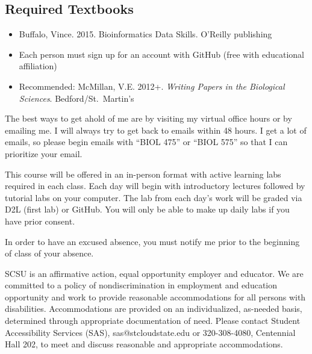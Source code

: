 \documentclass{tufte-handout}
\begin{document}
\begin{fullwidth}
\subsection{Required Textbooks}

\begin{itemize}
	\item Buffalo, Vince. 2015. Bioinformatics Data Skills. O'Reilly publishing 
	\item Each person must sign up for an account with GitHub (free with educational affiliation)
	\item Recommended: McMillan, V.E. 2012+. \emph{Writing Papers in the Biological Sciences}. Bedford/St.\ Martin's
\end{itemize}


 The best ways to get ahold of me are by visiting my virtual office hours or by emailing me. I will always try to get back to emails within 48 hours. I get a lot of emails, so please begin emails with ``BIOL 475'' or ``BIOL 575'' so that I can prioritize your email.

 This course will be offered in an in-person format with active learning labs required in each class. Each day will begin with introductory lectures followed by tutorial labs on your computer. The lab from each day's work will be graded via D2L (first lab) or GitHub. You will only be able to make up daily labs if you have prior consent. 


\color{blue}
In order to have an excused absence, you must notify me prior to the beginning of class of your absence. 
\color{black}


 SCSU is an affirmative action, equal opportunity employer and educator. We are committed to a policy of nondiscrimination in employment and education opportunity and work to provide reasonable accommodations for all persons with disabilities. Accommodations are provided on an individualized, as-needed basis, determined through appropriate documentation of need. Please contact Student Accessibility Services (SAS), sas@stcloudstate.edu or 320-308-4080, Centennial Hall 202, to meet and discuss reasonable and appropriate accommodations. 


\end{fullwidth}
\end{document}
